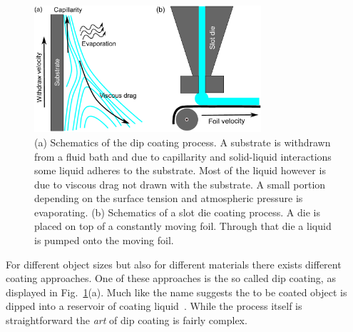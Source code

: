 \begin{figure}
    \centering
    \includegraphics[width=0.75\textwidth]{graphics/Coating_intro.pdf}
    \caption{(a) Schematics of the dip coating process. 
    A substrate is withdrawn from a fluid bath and due to capillarity and solid-liquid interactions some liquid adheres to the substrate.
    Most of the liquid however is due to viscous drag not drawn with the substrate.
    A small portion depending on the surface tension and atmospheric pressure is evaporating.
    (b) Schematics of a slot die coating process.
    A die is placed on top of a constantly moving foil.
    Through that die a liquid is pumped onto the moving foil.}
    \label{fig:dip_coating}
\end{figure}
For different object sizes but also for different materials there exists different coating approaches.
One of these approaches is the so called dip coating, as displayed in Fig.~\ref{fig:dip_coating}(a). 
Much like the name suggests the to be coated object is dipped into a reservoir of coating liquid~\cite{scriven_1988, darhuber2000selective, grosso2011exploit}.
While the process itself is straightforward the \textit{art} of dip coating is fairly complex.

